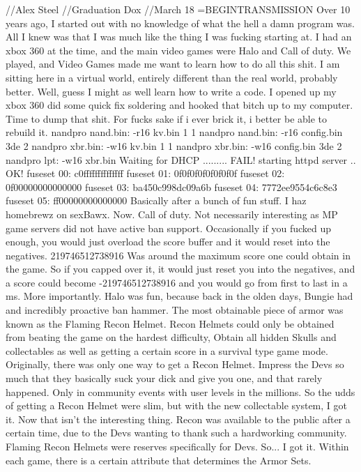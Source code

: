 //Alex Steel
//Graduation Dox
//March 18
=BEGINTRANSMISSION
Over 10 years ago, I started out with no knowledge of what the hell a damn program was.
All I knew was that I was much like the thing I was fucking starting at.
I had an xbox 360 at the time, and the main video games were Halo and Call of duty.
We played, and Video Games made me want to learn how to do all this shit.
I am sitting here in a virtual world, entirely different than the real world, probably better.
Well, guess I might as well learn how to write a code.
I opened up my xbox 360 did some quick fix soldering and hooked that bitch up to my computer.
Time to dump that shit. For fucks sake if i ever brick it, i better be able to rebuild it.
nandpro nand.bin: -r16 kv.bin 1 1
nandpro nand.bin: -r16 config.bin 3de 2
nandpro xbr.bin: -w16 kv.bin 1 1
nandpro xbr.bin: -w16 config.bin 3de 2
nandpro lpt: -w16 xbr.bin
Waiting for DHCP ......... FAIL!
starting httpd server .. OK!
fuseset 00: c0ffffffffffffff
fuseset 01: 0f0f0f0f0f0f0f0f
fuseset 02: 0f00000000000000
fuseset 03: ba450c998dc09a6b
fuseset 04: 7772ee9554c6c8e3
fuseset 05: ff00000000000000
Basically after a bunch of fun stuff. I haz homebrewz on sexBawx.
Now. Call of duty. Not necessarily interesting as MP game servers 
did not have active ban support. Occasionally if you fucked up enough, 
you would just overload the score buffer and it would reset into the negatives.
219746512738916 Was around the maximum score one could obtain in the game.
So if you capped over it, it would just reset you into the negatives, and a score
could become -219746512738916 and you would go from first to last in a ms.
More importantly. Halo was fun, because back in the olden days, Bungie had
and incredibly proactive ban hammer. The most obtainable piece of armor
was known as the Flaming Recon Helmet. Recon Helmets could only be obtained
from beating the game on the hardest difficulty, Obtain all hidden Skulls and collectables
as well as getting a certain score in a survival type game mode. Originally, there was only
one way to get a Recon Helmet. Impress the Devs so much that they basically suck your dick
and give you one, and that rarely happened. Only in community events with user levels in the millions.
So the udds of getting a Recon Helmet were slim, but with the new collectable system, I got it.
Now that isn't the interesting thing. Recon was available to the public after a certain time,
due to the Devs wanting to thank such a hardworking community. Flaming Recon Helmets were
reserves specifically for Devs. So... I got it.
Within each game, there is a certain attribute that determines the Armor Sets.
